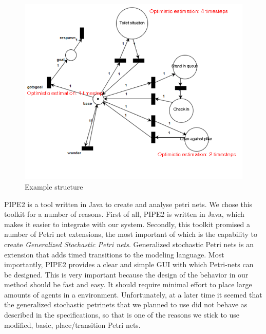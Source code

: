 \documentclass[11pt, a4paper]{book}
\begin{document}
\begin{figure}
\centering
\includegraphics[width=350pt]{example}
\caption{Example structure}
\label{petrinetexample}
\end{figure}

PIPE2 is a tool written in Java to create and analyse petri nets. We chose this toolkit for a number of reasons. First of all, PIPE2 is written in Java, which makes it easier to integrate with our system. Secondly, this toolkit promised a number of Petri net extensions, the most important of which is the capability to create \emph{Generalized Stochastic Petri nets}. Generalized stochastic Petri nets is an extension that adds timed transitions to the modeling language. Most importantly, PIPE2 provides a clear and simple GUI with which Petri-nets can be designed. This is very important because the design of the behavior in our method should be fast and easy. It should require minimal effort to place large amounts of agents in a environment.
Unfortunately, at a later time it seemed that the generalized stochastic petrinets that we planned to use did not behave as described in the specifications, so that is one of the reasons we stick to use modified, basic, place/transition Petri nets.  
\end{document}
